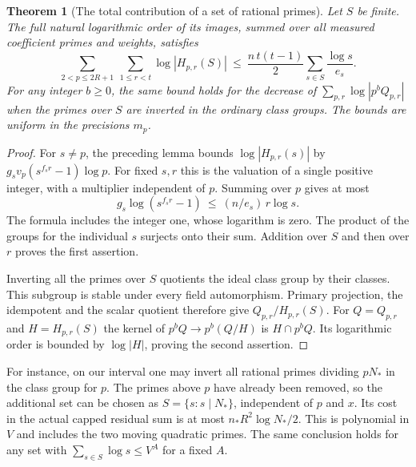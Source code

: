 \documentclass[a4paper,11pt]{article}
\newtheorem{theorem}[proposition]{Theorem}
\theoremstyle{definition}
\theoremstyle{remark}
\numberwithin{equation}{section}
\begin{document}
\begin{theorem}[The total contribution of a set of rational primes]
\leavevmode\label{thm:primemass650}
Let \(S\) be finite. The full natural logarithmic order of its
images, summed over all measured coefficient primes and weights,
satisfies
\[
 \sum_{2<p\le2R+1}\ \sum_{1\le r<t}\log |H_{p,r}(S)|
 \ \le\ \frac{n\,t(t-1)}{2}\sum_{s\in S}\frac{\log s}{e_s}.
\]
For any integer \(b\ge0\), the same bound holds for the
decrease of \(\sum_{p,r}\log|p^bQ_{p,r}|\) when the primes
over \(S\) are inverted in the ordinary class groups.
The bounds are uniform in the precisions \(m_p\).
\end{theorem}
\begin{proof}
For \(s\ne p\), the preceding lemma bounds
\(\log |H_{p,r}(s)|\) by
\(g_s v_p(s^{f_s r}-1)\log p\). For fixed \(s,r\) this is
the valuation of a single positive integer, with a multiplier
independent of \(p\). Summing over \(p\) gives at most
\[
 g_s\log(s^{f_s r}-1)\ \le\ (n/e_s)\,r\log s.
\]
The formula includes the integer one, whose logarithm is zero.
The product of the groups for the individual \(s\) surjects
onto their sum. Addition over \(S\) and then over \(r\)
proves the first assertion.

Inverting all the primes over \(S\) quotients the ideal class
group by their classes. This subgroup is stable under every
field automorphism. Primary projection, the idempotent and the
scalar quotient therefore give \(Q_{p,r}/H_{p,r}(S)\).
For \(Q=Q_{p,r}\) and \(H=H_{p,r}(S)\) the kernel of
\(p^b Q\longrightarrow p^b(Q/H)\) is \(H\cap p^b Q\).
Its logarithmic order is bounded by \(\log |H|\), proving
the second assertion.
\end{proof}

For instance, on our interval one may invert all rational
primes dividing \(pN_*\) in the class group for \(p\). The
primes above \(p\) have already been removed, so the additional
set can be chosen as \(S=\{s:s\mid N_*\}\), independent of
\(p\) and \(x\). Its cost in the actual capped residual sum
is at most \(n_*R^2\log N_*/2\). This is polynomial in \(V\)
and includes the two moving quadratic primes. The same
conclusion holds for any set with
\(\sum_{s\in S}\log s\le V^A\) for a fixed \(A\).
\end{document}
